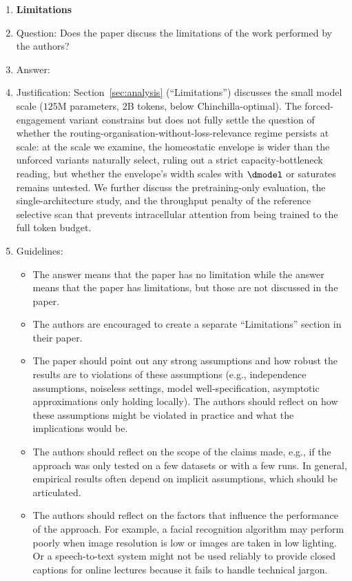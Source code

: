 \begin{enumerate}
\item {\bf Limitations}
    \item[] Question: Does the paper discuss the limitations of the work performed by the authors?
    \item[] Answer: \answerYes{}
    \item[] Justification: Section~\ref{sec:analysis} (``Limitations'') discusses the small model scale ($125$M parameters, $2$B tokens, below Chinchilla-optimal). The forced-engagement variant constrains but does not fully settle the question of whether the routing-organisation-without-loss-relevance regime persists at scale: at the scale we examine, the homeostatic envelope is wider than the unforced variants naturally select, ruling out a strict capacity-bottleneck reading, but whether the envelope's width scales with $\dmodel$ or saturates remains untested. We further discuss the pretraining-only evaluation, the single-architecture study, and the throughput penalty of the reference selective scan that prevents intracellular attention from being trained to the full token budget.
    \item[] Guidelines:
    \begin{itemize}
        \item The answer \answerNA{} means that the paper has no limitation while the answer \answerNo{} means that the paper has limitations, but those are not discussed in the paper. 
        \item The authors are encouraged to create a separate ``Limitations'' section in their paper.
        \item The paper should point out any strong assumptions and how robust the results are to violations of these assumptions (e.g., independence assumptions, noiseless settings, model well-specification, asymptotic approximations only holding locally). The authors should reflect on how these assumptions might be violated in practice and what the implications would be.
        \item The authors should reflect on the scope of the claims made, e.g., if the approach was only tested on a few datasets or with a few runs. In general, empirical results often depend on implicit assumptions, which should be articulated.
        \item The authors should reflect on the factors that influence the performance of the approach. For example, a facial recognition algorithm may perform poorly when image resolution is low or images are taken in low lighting. Or a speech-to-text system might not be used reliably to provide closed captions for online lectures because it fails to handle technical jargon.

\end{itemize}
\end{enumerate}
